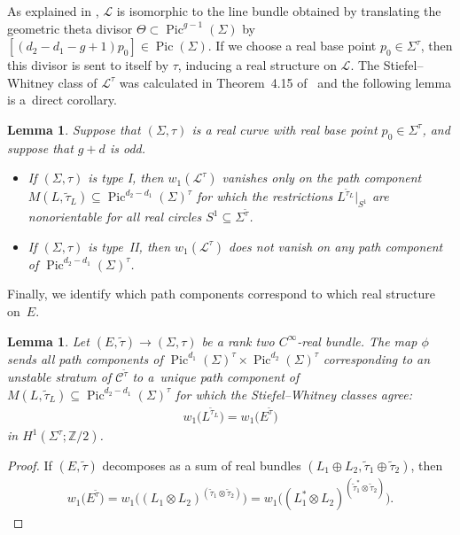 \documentclass[pdftex]{sigma}
\numberwithin{equation}{section}
\newtheorem{Lemma}[Theorem]{Lemma}
\begin{document}
As explained in \cite[Section~1]{OT}, ${\mathcal L}$ is isomorphic to the line bundle obtained by translating the geometric theta divisor $\Theta \subset \operatorname{Pic}^{g-1}(\Sigma)$ by $[(d_2-d_1-g+1)p_0] \in \operatorname{Pic}(\Sigma)$. If we choose a real base point $p_0 \in \Sigma^{\tau}$, then this divisor is sent to itself by $\tau$, inducing a real structure on ${\mathcal L}$. The Stiefel--Whitney class of ${\mathcal L}^{\tau}$ was calculated in Theorem~4.15 of~\cite{OT} and the following lemma is a~direct corollary.

\begin{Lemma}\label{orientability}
Suppose that $(\Sigma,\tau)$ is a real curve with real base point $p_0 \in \Sigma^{\tau}$, and suppose that $g +d$ is odd.
\begin{itemize}\itemsep=0pt
\item[$(i)$]If $(\Sigma,\tau)$ is type I, then $w_1( {\mathcal L}^{\tau})$ vanishes only on the path component $M(L, \tilde{\tau}_L) {\subseteq}\! \operatorname{Pic}^{d_2{-}d_1}\!(\Sigma)^{\tau}$ for which the restrictions $L^{\tilde{\tau}_L}|_{S^1}$ are nonorientable for all real circles $S^1 \subseteq \Sigma^{\tilde{\tau}}$.	
\item[$(ii)$] If $(\Sigma,\tau)$ is type~II, then $w_1( {\mathcal L} ^{\tau})$ does not vanish on any path component of $\operatorname{Pic}^{d_2-d_1}(\Sigma)^{\tau}$.
\end{itemize}
\end{Lemma}

Finally, we identify which path components correspond to which real structure on~$E$.

\begin{Lemma}\label{orientSWstuff}
Let $(E,\tilde{\tau}) \rightarrow (\Sigma,\tau)$ be a rank two $C^{\infty}$-real bundle. The map $\phi$ sends all path components of $\operatorname{Pic}^{d_1}(\Sigma)^{\tau} \times \operatorname{Pic}^{d_2}(\Sigma)^{\tau}$ corresponding to an unstable stratum of ${\mathcal C}^{\tilde{\tau}}$ to a~unique path component of $M(L, \tilde{\tau}_L) \subseteq \operatorname{Pic}^{d_2-d_1}(\Sigma)^{\tau}$ for which the Stiefel--Whitney classes agree:{\samepage \begin{gather*}w_1\big( L^{\tilde{\tau}_{L}}\big) = w_1\big(E^{\tilde{\tau}}\big)\end{gather*}
in $H^1(\Sigma^{\tau}; {\mathbb Z}/2)$.}
\end{Lemma}

\begin{proof}
If $(E,\tilde{\tau})$ decomposes as a sum of real bundles $(L_1 \oplus L_2, \tilde{\tau}_1 \oplus \tilde{\tau}_2)$, then
 \begin{gather*}
 w_1\big(E^{\tilde{\tau}} \big) = w_1\big((L_1 \otimes L_2)^{(\tilde{\tau}_1 \otimes \tilde{\tau}_2)}\big) = w_1\big((L_1^* \otimes L_2)^{(\tilde{\tau}_1^* \otimes \tilde{\tau}_2)}\big).\tag*{\qed}
 \end{gather*}
\renewcommand{\qed}{}
\end{proof}
\end{document}
